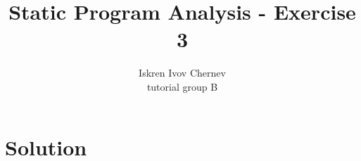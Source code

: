 \documentclass[a4paper]{article}
\begin{document}
\newcommand{\aee}[1] {[[#1]]^\sharp}
\newcommand{\cc}[1] {\texttt{#1}}
\def\A {\mathcal{A}}
\def\N {\mathcal{N}}
\def\NonZero {\mathrm{NonZero}}
\def\Zero {\mathrm{Zero}}
\def\Vars {\mathrm{Vars}}
\def\Occ {\mathrm{Occ}}

\title{Static Program Analysis - Exercise 3}
\author{Iskren Ivov Chernev \\ tutorial group B}

\maketitle

\section{Solution}
\end{document}
